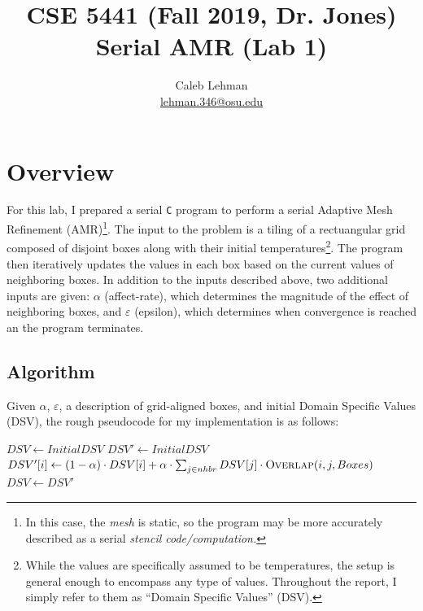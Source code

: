 \documentclass{article}
\title{
CSE 5441 (Fall 2019, Dr. Jones)\\
\large Serial AMR (Lab 1)
}
\author{
Caleb Lehman \\
\href{mailto:lehman.346@osu.edu}{lehman.346@osu.edu}
}
\begin{document}
\maketitle

\section*{Overview}
\label{sec:overview}

For this lab, I prepared a serial \texttt{C} program to perform a serial
Adaptive Mesh Refinement (AMR)\footnote{In this case, the \emph{mesh} is static,
so the program may be more accurately described as a serial \emph{stencil
code/computation.}}. The input to the problem is a tiling of a rectuangular
grid composed of disjoint boxes along with their initial
temperatures\footnote{While the values are specifically assumed to be temperatures,
the setup is general enough to encompass any type of values. Throughout the
report, I simply refer to them as ``Domain Specific Values'' (DSV).}. The
program then iteratively updates the values in each box based on the current
values of neighboring boxes. In addition to the inputs described above, two
additional inputs are given: $\alpha$ (affect-rate), which determines the
magnitude of the effect of neighboring boxes, and $\varepsilon$ (epsilon),
which determines when convergence is reached an the program terminates.

\subsection*{Algorithm}
\label{subsec:algorithm}

Given $\alpha$, $\varepsilon$, a description of grid-aligned boxes, and initial
Domain Specific Values (DSV), the rough pseudocode for my implementation is as
follows:

\begin{algorithm}
\begin{algorithmic}[1]
\State $DSV \gets Initial DSV$
\State $DSV' \gets Initial DSV$
 \label{alg:amr:convergence}
        \State $DSV'[i] \gets (1 - \alpha)\cdot DSV[i] + \alpha \cdot \sum_{j\in nhbr} DSV[j]\cdot \Call{Overlap}{i, j, Boxes}$ \label{alg:amr:stencil}
    \EndFor
    \State $DSV \gets DSV'$ \label{alg:amr:commit}
\EndWhile
\EndProcedure
\end{algorithmic}
\end{algorithm}
\end{document}
